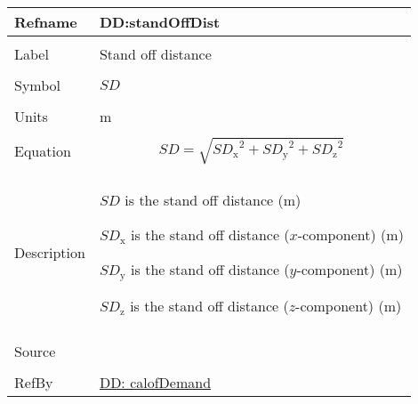 \documentclass[12pt]{article}
\begin{document}
\vspace{\baselineskip}
\noindent
\begin{minipage}{\textwidth}
\begin{tabular}{>{\raggedright}p{}>{\raggedright\arraybackslash}p{}}
\toprule \textbf{Refname} & \textbf{DD:standOffDist}
\label{DD:standOffDist}
\\ \midrule \\
Label & Stand off distance
        
\\ \midrule \\
Symbol & $SD$
         
\\ \midrule \\
Units & m
        
\\ \midrule \\
Equation & \begin{displaymath}
           SD=\sqrt{{SD_{\text{x}}}^{2}+{SD_{\text{y}}}^{2}+{SD_{\text{z}}}^{2}}
           \end{displaymath}
\\ \midrule \\
Description & \begin{symbDescription}
              \item{$SD$ is the stand off distance (m)}
              \item{${SD_{\text{x}}}$ is the stand off distance ($x$-component) (m)}
              \item{${SD_{\text{y}}}$ is the stand off distance ($y$-component) (m)}
              \item{${SD_{\text{z}}}$ is the stand off distance ($z$-component) (m)}
              \end{symbDescription}
\\ \midrule \\
Source & \cite{astm2009}
         
\\ \midrule \\
RefBy & \hyperref[DD:calofDemand]{DD: calofDemand}
        
\\ \bottomrule
\end{tabular}
\end{minipage}
\end{document}
